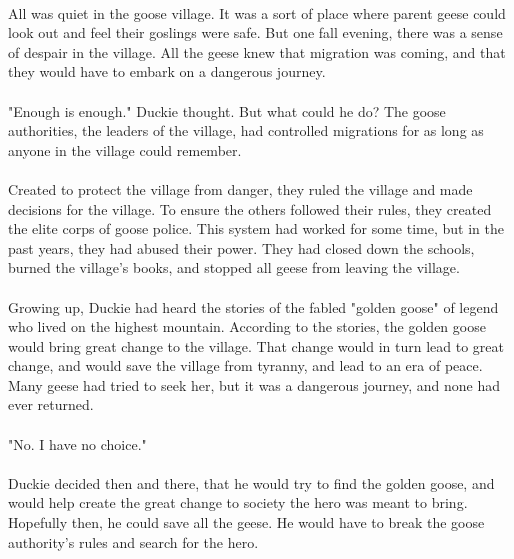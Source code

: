 \documentclass[a4paper,11pt,standalone]{book}
\begin{document}
\tableofcontents
\vfill
\pagebreak
\paragraph{} All was quiet in the goose village. It was a sort of place where parent geese could look out and feel their goslings were safe. But one fall evening, there was a sense of despair in the village. All the geese knew that migration was coming, and that they would have to embark on a dangerous journey. 
\paragraph{} "Enough is enough." Duckie thought. But what could he do? The goose authorities, the leaders of the village, had controlled migrations for as long as anyone in the village could remember. 
\paragraph{} Created to protect the village from danger, they ruled the village and made decisions for the village. To ensure the others followed their rules, they created the elite corps of goose police. This system had worked for some time, but in the past years, they had abused their power. They had closed down the schools, burned the village's books, and stopped all geese from leaving the village.
\paragraph{} Growing up, Duckie had heard the stories of the fabled "golden goose" of legend who lived on the highest mountain. According to the stories, the golden goose would bring great change to the village. That change would in turn lead to great change, and would save the village from tyranny, and lead to an era of peace. Many geese had tried to seek her, but it was a dangerous journey, and none had ever returned. 
\paragraph{} "No. I have no choice." 
\paragraph{} Duckie decided then and there, that he would try to find the golden goose, and would help create the great change to society the hero was meant to bring. Hopefully then, he could save all the geese. He would have to break the goose authority's rules and search for the hero.
\vfill
\pagebreak







\end{document}
